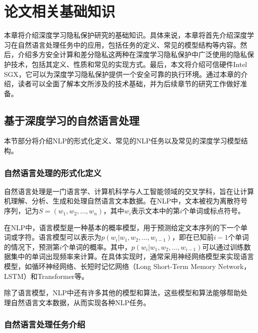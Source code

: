 
\chapter{论文相关基础知识}


本章将介绍深度学习隐私保护研究的基础知识。具体来说，本章将首先介绍深度学习在自然语言处理任务中的应用，包括任务的定义、常见的模型结构等内容。然后，介绍多方安全计算和差分隐私这两种在深度学习隐私保护中广泛使用的隐私保护技术，包括其定义、性质和常见的实现方式。最后，本文将介绍可信硬件Intel SGX，它可以为深度学习隐私保护提供一个安全可靠的执行环境。通过本章的介绍，读者可以全面了解本文所涉及的技术基础，并为后续章节的研究工作做好准备。

\section{基于深度学习的自然语言处理}

本节部分将介绍NLP的形式化定义、常见的NLP任务以及常见的深度学习模型结构。

\subsection{自然语言处理的形式化定义} \label{NLP_Def}

自然语言处理是一门语言学、计算机科学与人工智能领域的交叉学科，旨在让计算机理解、分析、生成和处理自然语言文本数据。在NLP中，文本被视为离散符号序列，记为$S=(w_1, w_2, ..., w_n)$，其中$w_i$表示文本中的第$i$个单词或标点符号。

在NLP中，语言模型是一种基本的概率模型，用于预测给定文本序列的下一个单词或字符。语言模型可以表示为$p(w_i|w_1, w_2, ..., w_{i-1})$，即在已知前$i-1$个单词的情况下，预测第$i$个单词的概率。其中，$p(w_i|w_1, w_2, ..., w_{i-1})$可以通过训练数据集中的单词出现频率来计算。在具体实现时，通常采用神经网络模型来实现语言模型，如循环神经网络、长短时记忆网络（Long Short-Term Memory Network，LSTM）和Transformer等。

除了语言模型，NLP中还有许多其他的模型和算法，这些模型和算法能够帮助处理自然语言文本数据，从而实现各种NLP任务。

\subsection{自然语言处理任务介绍}

